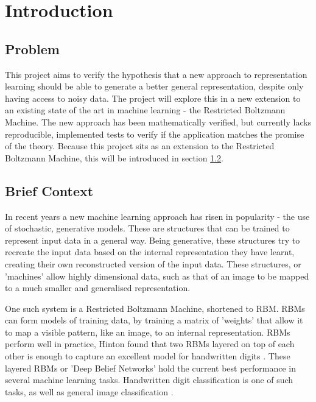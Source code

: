 \chapter{Introduction}\label{C:intro}

\section{Problem}\label{S:introproblem}

This project aims to verify the hypothesis that a new approach to representation learning should be able to generate a better general representation, despite only having access to noisy data. The project will explore this in a new extension to an existing state of the art in machine learning - the Restricted Boltzmann Machine. The new approach has been mathematically verified, but currently lacks reproducible, implemented tests to verify if the application matches the promise of the theory. Because this project sits as an extension to the Restricted Boltzmann Machine, this will be introduced in section \ref{S:introcontext}.

\section{Brief Context}\label{S:introcontext}
In recent years a new machine learning approach has risen in popularity - the use of stochastic, generative models. These are structures that can be trained to represent input data in a general way. Being generative, these structures try to recreate the input data based on the internal representation they have learnt, creating their own reconstructed version of the input data.
These structures, or 'machines' allow highly dimensional data, such as that of an image to be mapped to a much smaller and generalised representation.

One such system is a Restricted Boltzmann Machine, shortened to RBM. RBMs can form models of training data, by training a matrix of 'weights' that allow it to map a visible pattern, like an image, to an internal representation. RBMs perform well in practice, Hinton found that two RBMs layered on top of each other is enough to capture an excellent model for handwritten digits \cite{Hinton:2006dk}. These layered RBMs or 'Deep Belief Networks' hold the current best performance in several machine learning tasks. Handwritten digit classification is one of such tasks, as well as general image classification \cite{Bengio:2013bu}.

